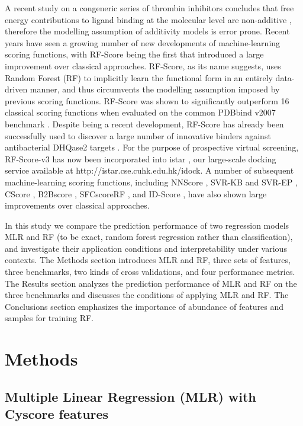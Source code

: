 A recent study on a congeneric series of thrombin inhibitors concludes that free energy contributions to ligand binding at the molecular level are non-additive \citep{1416}, therefore the modelling assumption of additivity models is error prone. Recent years have seen a growing number of new developments of machine-learning scoring functions, with RF-Score \citep{564} being the first that introduced a large improvement over classical approaches. RF-Score, as its name suggests, uses Random Forest (RF) \citep{1309} to implicitly learn the functional form in an entirely data-driven manner, and thus circumvents the modelling assumption imposed by previous scoring functions. RF-Score was shown to significantly outperform 16 classical scoring functions when evaluated on the common PDBbind v2007 benchmark \citep{564}. Despite being a recent development, RF-Score has already been successfully used to discover a large number of innovative binders against antibacterial DHQase2 targets \citep{1281}. For the purpose of prospective virtual screening, RF-Score-v3 has now been incorporated into istar \citep{1362}, our large-scale docking service available at http://istar.cse.cuhk.edu.hk/idock. A number of subsequent machine-learning scoring functions, including NNScore \citep{977}, SVR-KB and SVR-EP \citep{963}, CScore \citep{1194}, B2Bscore \citep{1410}, SFCscoreRF \citep{1347}, and ID-Score \citep{1305}, have also shown large improvements over classical approaches.

In this study we compare the prediction performance of two regression models MLR and RF (to be exact, random forest regression rather than classification), and investigate their application conditions and interpretability under various contexts. The Methods section introduces MLR and RF, three sets of features, three benchmarks, two kinds of cross validations, and four performance metrics. The Results section analyzes the prediction performance of MLR and RF on the three benchmarks and discusses the conditions of applying MLR and RF. The Conclusions section emphasizes the importance of abundance of features and samples for training RF.

\section{Methods}

\subsection{Multiple Linear Regression (MLR) with Cyscore features}

